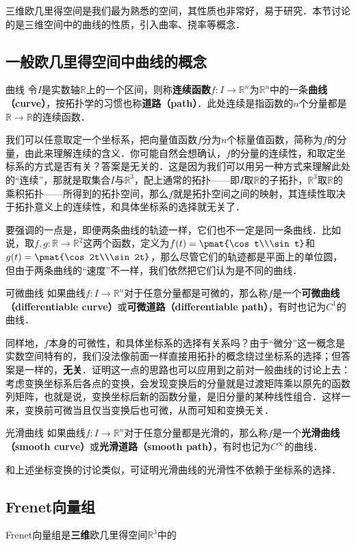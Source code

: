 
三维欧几里得空间是我们最为熟悉的空间，其性质也非常好，易于研究．本节讨论的是三维空间中的曲线的性质，引入曲率、挠率等概念．

\subsection{一般欧几里得空间中曲线的概念}

\begin{definition}{曲线}
令$I$是实数轴$\mathbb{R}$上的一个区间，则称\textbf{连续函数}$f:I\to \mathbb{R}^n$为$\mathbb{R}^n$中的一条\textbf{曲线（curve）}，按拓扑学的习惯也称\textbf{道路（path）}．此处连续是指函数的$n$个分量都是$\mathbb{R}\to\mathbb{R}$的连续函数．
\end{definition}

我们可以任意取定一个坐标系，把向量值函数$f$分为$n$个标量值函数，简称为$f$的分量，由此来理解连续的含义．你可能自然会想确认，$f$的分量的连续性，和取定坐标系的方式是否有关？答案是无关的．这是因为我们可以用另一种方式来理解此处的“连续”，那就是取集合$I$与$\mathbb{R}^3$，配上通常的拓扑——即$I$取$\mathbb{R}$的子拓扑，$\mathbb{R}^3$取$\mathbb{R}$的乘积拓扑——所得到的拓扑空间，那么$f$就是拓扑空间之间的映射，其连续性取决于拓扑意义上的连续性，和具体坐标系的选择就无关了．

要强调的一点是，即便两条曲线的轨迹一样，它们也不一定是同一条曲线．比如说，取$f, g:\mathbb{R}\to\mathbb{R}^2$这两个函数，定义为$f(t)=\pmat{\cos t\\\sin t}$和$g(t)=\pmat{\cos 2t\\\sin 2t}$，那么尽管它们的轨迹都是平面上的单位圆，但由于两条曲线的“速度”不一样，我们依然把它们认为是不同的曲线．

\begin{definition}{可微曲线}
如果曲线$f:I\to\mathbb{R}^n$对于任意分量都是可微的，那么称$f$是一个\textbf{可微曲线（differentiable curve）}或\textbf{可微道路（differentiable path）}，有时也记为$C^1$的曲线．
\end{definition}

同样地，$f$本身的可微性，和具体坐标系的选择有关系吗？由于“微分”这一概念是实数空间特有的，我们没法像前面一样直接用拓扑的概念绕过坐标系的选择；但答案是一样的，\textbf{无关}．证明这一点的思路也可以应用到之前对一般曲线的讨论上去：考虑变换坐标系后各点的变换，会发现变换后的分量就是过渡矩阵乘以原先的函数列矩阵，也就是说，变换坐标后新的函数分量，是旧分量的某种线性组合．这样一来，变换前可微当且仅当变换后也可微，从而可知和变换无关．

\begin{definition}{光滑曲线}
如果曲线$f:I\to\mathbb{R}^n$对于任意分量都是光滑的，那么称$f$是一个\textbf{光滑曲线（smooth curve）}或\textbf{光滑道路（smooth path）}，有时也记为$C^\infty$的曲线．
\end{definition}

和上述坐标变换的讨论类似，可证明光滑曲线的光滑性不依赖于坐标系的选择．

\subsection{Frenet向量组}

Frenet向量组是\textbf{三维}欧几里得空间$\mathbb{R}^3$中的








